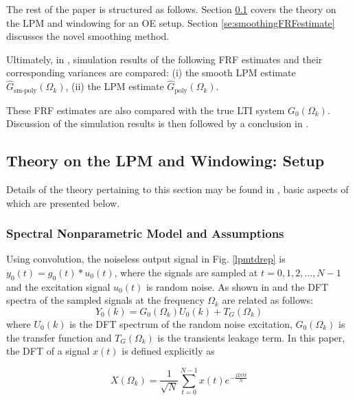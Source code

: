 The rest of the paper is structured as follows. Section \ref{se:theoryLPMandWindowing} covers the theory on the LPM and windowing for an OE setup. 
Section \ref{se:smoothingFRFestimate} discusses the novel smoothing method. 



Ultimately, in , simulation results of the following FRF estimates and their corresponding variances are compared: (i) the smooth LPM estimate $\hat{G}_\text{sm-poly}(\Omega_k)$, (ii) the LPM estimate $\hat{G}_\text{poly}(\Omega_k)$. 

These FRF estimates are also compared with the true \gls{LTI} system ${G}_0(\Omega_k)$. 
Discussion of the simulation results is then followed by a conclusion in .

\subsection{Theory on the LPM and Windowing:  Setup}
\label{se:theoryLPMandWindowing}

Details of the theory pertaining to this section may be found in \citep{Schoukens2009LPM}, basic aspects of which are presented below.


\subsubsection{Spectral Nonparametric Model and Assumptions}

Using convolution, the noiseless output signal in Fig. \ref{lpmtdrep} is $y_0(t) = g_0(t)*u_0(t)$, where the signals are sampled at $t = 0, 1, 2,...,N-1$ and the excitation signal $u_0(t)$ is random noise. As shown in \citep{Pintelon2012} and \citep{Pintelon1997} the \gls{DFT} spectra of the sampled signals at the frequency $\Omega_k$ are related as follows:
\begin{equation}\label{lpmleak}
Y_0(k)=G_0(\Omega_k)U_0(k)+T_G(\Omega_k)
\end{equation}
where $U_0(k)$ is the \gls{DFT} spectrum of the random noise excitation,  $G_0(\Omega_k)$ is the transfer function and $T_G(\Omega_k)$ is the transients leakage term. 
In this paper, the \gls{DFT} of a signal $x(t)$ is defined explicitly as  \citep{Oppenheim1983}

\begin{equation}\label{eq:defDFT}
X(\Omega_k) = \frac{1}{\sqrt{N}}\sum_{t=0}^{N-1}x(t)e^{-\frac{j2\pi kt}{N}}
\end{equation}


